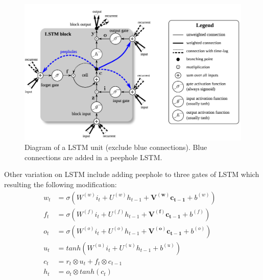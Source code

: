 \begin{figure}[H]
	\centering
	\includegraphics[scale=0.4]{figure/lstm}
	\caption{Diagram of a LSTM unit (exclude blue connections). Blue connections are added in a peephole LSTM.\cite{lstm-search}}
	\label{fig:lstm}
\end{figure}


Other variation on LSTM include adding peephole to three gates of LSTM\cite{peephole} which resulting the following modification\cite{colah-lsmt}:
\begin{align}
	w_t &= \sigma(W^{(w)}i_t + U^{(w)}h_{t-1} + \bm{V^{(w)}c_{t-1}} + b^{(w)}) &\\ 
  	f_t &= \sigma(W^{(f)}i_t + U^{(f)}h_{t-1} + \bm{V^{(f)}c_{t-1}} + b^{(f)}) &\\ 
  	o_t &= \sigma(W^{(o)}i_t + U^{(o)}h_{t-1} + \bm{V^{(o)}c_{t-1}} + b^{(o)}) &\\ 
  	u_t &= tanh(W^{(u)}i_t + U^{(u)}h_{t-1} + b^{(u)}) &\\ 
  	c_t &= r_t \otimes u_t + f_t \otimes c_{t-1} &\\ 
  	h_t &= o_t \otimes tanh(c_t) & 
\end{align} 

